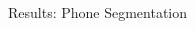 \documentclass[final]{beamer}
\newcommand{\tablecaptionsep}{\vspace*{-0pt}}
\newlength{\columnheight}
\begin{document}
\begin{frame}[t]
\begin{columns}[T]
\begin{column}{.33\linewidth}
\begin{minipage}[T]{.97\textwidth}
{}\end{minipage}
\end{column}



\begin{column}{.33\linewidth}
\centering
\begin{minipage}[T]{.97\textwidth}\parbox[t][\columnheight]{\textwidth}{



\begin{block}{Results: Phone Segmentation}
    



    

\end{block}}
\end{minipage}
\end{column}
\end{columns}
\end{frame}
\end{document}
